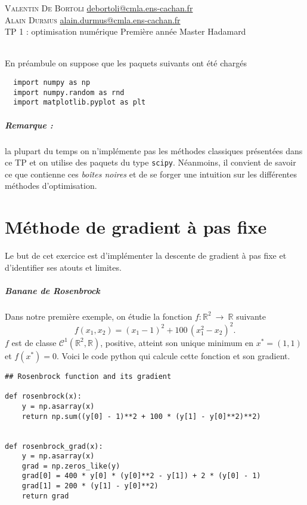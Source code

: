 \documentclass[a4paper,french,12pt]{article}
\begin{document}
\noindent
 \textsc{Valentin De Bortoli} \hfill \url{debortoli@cmla.ens-cachan.fr} \\
    \textsc{Alain Durmus} \hfill \url{alain.durmus@cmla.ens-cachan.fr}
    \\
    TP 1 : optimisation numérique\hfill
    Première année Master Hadamard\\
\hrulefill\ \\
    
 \vspace{-5cm} 


En préambule on suppose que les paquets suivants ont été chargés
\begin{lstlisting}
  import numpy as np
  import numpy.random as rnd
  import matplotlib.pyplot as plt
\end{lstlisting}

\subparagraph{Remarque :} la plupart du temps on n'implémente pas les méthodes classiques présentées dans ce TP et on utilise des paquets du type \texttt{scipy}. Néanmoins, il convient de savoir ce que contienne ces \textit{boîtes noires} et de se forger une intuition sur les différentes méthodes d'optimisation.

\section{Méthode de gradient à pas fixe}
%
Le but de cet exercice est d'implémenter la descente de gradient à pas fixe et d'identifier ses
atouts et limites. 
\subparagraph{Banane de Rosenbrock}
Dans notre première exemple, on étudie la fonction $f: \mathbb{R}^2 \ \rightarrow \ \mathbb{R}$ suivante
\[
f(x_1,x_2) = (x_1-1)^2 + 100\, (x_1^2-x_2)^2.
\]
$f$ est de classe $\mathcal{C}^1(\mathbb{R}^2, \mathbb{R})$, positive, atteint son unique minimum en $x^* = (1,1)$ et $f(x^*) = 0$.
Voici le code python qui calcule cette fonction et son gradient.
\begin{lstlisting}
## Rosenbrock function and its gradient

def rosenbrock(x):
    y = np.asarray(x)
    return np.sum((y[0] - 1)**2 + 100 * (y[1] - y[0]**2)**2)


def rosenbrock_grad(x):
    y = np.asarray(x)
    grad = np.zeros_like(y)
    grad[0] = 400 * y[0] * (y[0]**2 - y[1]) + 2 * (y[0] - 1)
    grad[1] = 200 * (y[1] - y[0]**2)
    return grad
  \end{lstlisting}
\end{document}
